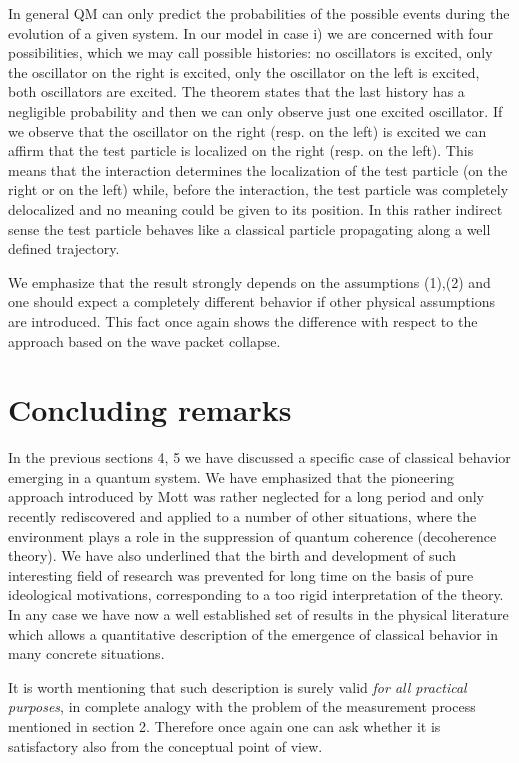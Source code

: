 \documentclass[12pt,reqno]{amsart}
\newcommand{\n}{\relax}
\newcommand{\vs}{\medskip}
\numberwithin{equation}{section}
\begin{document}
\n
In general QM can only predict  the probabilities of the possible events during the evolution of  a given system. In our model in case i) we are concerned with four possibilities, which we may call possible histories:  no oscillators is excited, only the oscillator on the right is excited, only the oscillator on the left is excited, both oscillators are excited. The theorem states that the last history has a negligible probability and then we can only observe just one excited oscillator. If we observe that the oscillator on the right (resp. on the left) is excited we can affirm that the test particle is localized on the right (resp. on the left). This means that  the interaction determines the localization of the test particle (on the right or on the left) while, before the interaction, the test particle was completely delocalized and no meaning could be given to its position. In this rather indirect sense the test particle behaves like a classical particle propagating along a well defined trajectory.

\n
We emphasize that the result strongly depends on the assumptions (1),(2) and one should expect a completely different behavior if other physical assumptions are introduced.  
This fact once again shows the difference with respect to the approach based on the wave packet collapse.




\vs
\vs
\section{Concluding remarks} 

\vs
\n
In the previous sections 4, 5 we have discussed a specific case of classical behavior emerging in a quantum system. We have emphasized  that the pioneering approach introduced by  Mott was  rather neglected  for a long period and only  recently  rediscovered and applied to a number of other situations, where the environment plays a role in the suppression of quantum coherence (decoherence theory). 
We have also underlined that the birth and development of such interesting field of research was prevented for long time on the basis of pure ideological motivations, corresponding to a too rigid interpretation of the theory. 
In any case we have now a well established set of results in the physical literature which allows a  quantitative description of the emergence of classical behavior in many concrete situations.

\n
It is worth mentioning that such description  is surely valid {\em for all practical purposes}, in complete analogy with 
the problem of the measurement process mentioned in section 2. Therefore once again one can ask whether it is satisfactory also from the conceptual point of view.
\end{document}
